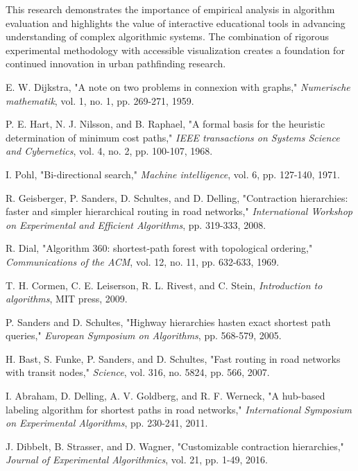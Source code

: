 \documentclass[conference]{IEEEtran}
\begin{document}
This research demonstrates the importance of empirical analysis in algorithm evaluation and highlights the value of interactive educational tools in advancing understanding of complex algorithmic systems. The combination of rigorous experimental methodology with accessible visualization creates a foundation for continued innovation in urban pathfinding research.

\begin{thebibliography}{00}
 E. W. Dijkstra, "A note on two problems in connexion with graphs," \textit{Numerische mathematik}, vol. 1, no. 1, pp. 269-271, 1959.

 P. E. Hart, N. J. Nilsson, and B. Raphael, "A formal basis for the heuristic determination of minimum cost paths," \textit{IEEE transactions on Systems Science and Cybernetics}, vol. 4, no. 2, pp. 100-107, 1968.

 I. Pohl, "Bi-directional search," \textit{Machine intelligence}, vol. 6, pp. 127-140, 1971.

 R. Geisberger, P. Sanders, D. Schultes, and D. Delling, "Contraction hierarchies: faster and simpler hierarchical routing in road networks," \textit{International Workshop on Experimental and Efficient Algorithms}, pp. 319-333, 2008.

 R. Dial, "Algorithm 360: shortest-path forest with topological ordering," \textit{Communications of the ACM}, vol. 12, no. 11, pp. 632-633, 1969.

 T. H. Cormen, C. E. Leiserson, R. L. Rivest, and C. Stein, \textit{Introduction to algorithms}, MIT press, 2009.

 P. Sanders and D. Schultes, "Highway hierarchies hasten exact shortest path queries," \textit{European Symposium on Algorithms}, pp. 568-579, 2005.

 H. Bast, S. Funke, P. Sanders, and D. Schultes, "Fast routing in road networks with transit nodes," \textit{Science}, vol. 316, no. 5824, pp. 566, 2007.

 I. Abraham, D. Delling, A. V. Goldberg, and R. F. Werneck, "A hub-based labeling algorithm for shortest paths in road networks," \textit{International Symposium on Experimental Algorithms}, pp. 230-241, 2011.

 J. Dibbelt, B. Strasser, and D. Wagner, "Customizable contraction hierarchies," \textit{Journal of Experimental Algorithmics}, vol. 21, pp. 1-49, 2016.


\end{thebibliography}
\end{document}
